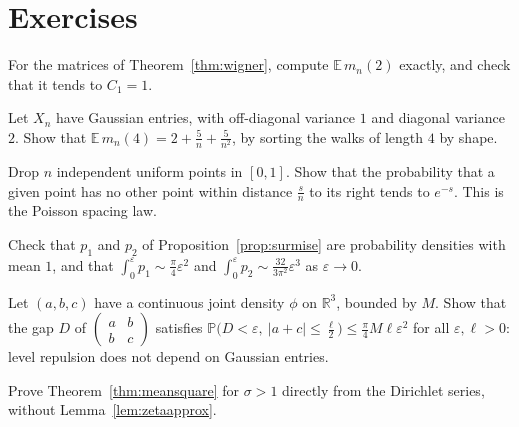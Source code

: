 \section{Exercises}

\begin{exercise}[$\star$]\label{ex:trace2}
For the matrices of Theorem~\ref{thm:wigner}, compute $\mathbb E\,m_n(2)$ exactly, and check that it tends to $C_1=1$.
\end{exercise}

\begin{exercise}[$\star\star$]\label{ex:trace4}
Let $X_n$ have Gaussian entries, with off-diagonal variance $1$ and diagonal variance $2$. Show that $\mathbb E\,m_n(4)=2+\frac5n+\frac5{n^2}$, by sorting the walks of
length $4$ by shape.
\end{exercise}

\begin{exercise}[$\star$]\label{ex:poissonsp}
Drop $n$ independent uniform points in $[0,1]$. Show that the probability that a given point has no other point within distance $\frac sn$ to its right
tends to $e^{-s}$. This is the Poisson spacing law.
\end{exercise}

\begin{exercise}[$\star$]\label{ex:surmisemean}
Check that $p_1$ and $p_2$ of Proposition~\ref{prop:surmise} are probability densities with mean $1$, and that $\int_0^\varepsilon p_1\sim\frac\pi4\varepsilon^2$ and
$\int_0^\varepsilon p_2\sim\frac{32}{3\pi^2}\varepsilon^3$ as $\varepsilon\to0$.
\end{exercise}

\begin{exercise}[$\star\star$]\label{ex:repulsion}
Let $(a,b,c)$ have a continuous joint density $\phi$ on $\mathbb R^3$, bounded by $M$. Show that the gap $D$ of $\begin{pmatrix}a&b\\b&c\end{pmatrix}$
satisfies $\mathbb P\bigl(D<\varepsilon,\ |a+c|\le\frac\ell2\bigr)\le\frac\pi4M\ell\varepsilon^2$ for all $\varepsilon,\ell>0$: level repulsion does not depend
on Gaussian entries.
\end{exercise}

\begin{exercise}[$\star$]\label{ex:sigmagt1}
Prove Theorem~\ref{thm:meansquare} for $\sigma>1$ directly from the Dirichlet series, without Lemma~\ref{lem:zetaapprox}.
\end{exercise}

